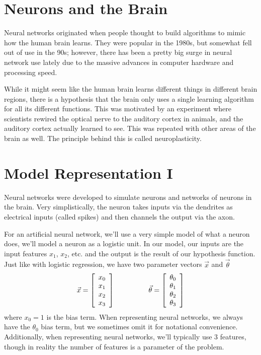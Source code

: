 \section{Neurons and the Brain}
Neural networks originated when people thought to build algorithms to mimic how the human brain learns. They were popular in the 1980s, but somewhat fell out of use in the 90s; however, there has been a pretty big surge in neural network use lately due to the massive advances in computer hardware and processing speed. 

While it might seem like the human brain learns different things in different brain regions, there is a hypothesis that the brain only uses a single learning algorithm for all its different functions. This was motivated by an experiment where scientists rewired the optical nerve to the auditory cortex in animals, and the auditory cortex actually learned to see. This was repeated with other areas of the brain as well. The principle behind this is called neuroplasticity.

\section{Model Representation I}
Neural networks were developed to simulate neurons and networks of neurons in the brain. Very simplistically, the neuron takes inputs via the dendrites as electrical inputs (called spikes) and then channels the output via the axon. 

For an artificial neural network, we'll use a very simple model of what a neuron does, we'll model a neuron as a logistic unit. In our model, our inputs are the input features $x_1$, $x_2$, etc. and the output is the result of our hypothesis function. Just like with logistic regression, we have two parameter vectors $\vec{x}$ and $\vec{\theta}$
$$
\vec{x} = \left[\begin{array}{c}x_0 \\ x_1 \\ x_2 \\ x_3 \end{array}\right] ~~\mbox{ \;\;\;\;\;\;\;\;\;\; }~~ \vec{\theta} = \left[\begin{array}{c}\theta_0 \\ \theta_1 \\ \theta_2 \\ \theta_3 \end{array}\right]
$$
where $x_0 = 1$ is the bias term. When representing neural networks, we always have the $\theta_0$ bias term, but we sometimes omit it for notational convenience. Additionally, when representing neural networks, we'll typically use $3$ features, though in reality the number of features is a parameter of the problem. 

